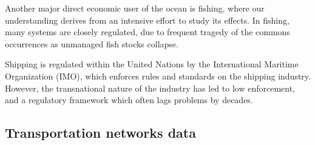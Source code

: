 

Another major direct economic user of the ocean is fishing, where our understanding derives from an intensive effort to study its effects. %
In fishing, many systems are closely regulated, %
 due to frequent tragedy of the commons occurrences as unmanaged fish stocks collapse. %

  Shipping is regulated within the United Nations by the International Maritime Organization (IMO), which enforces rules and standards on the shipping industry. However, the transnational nature of the industry has led to low enforcement, and a regulatory framework which often lags problems by decades. %



\subsection{Transportation networks data}

